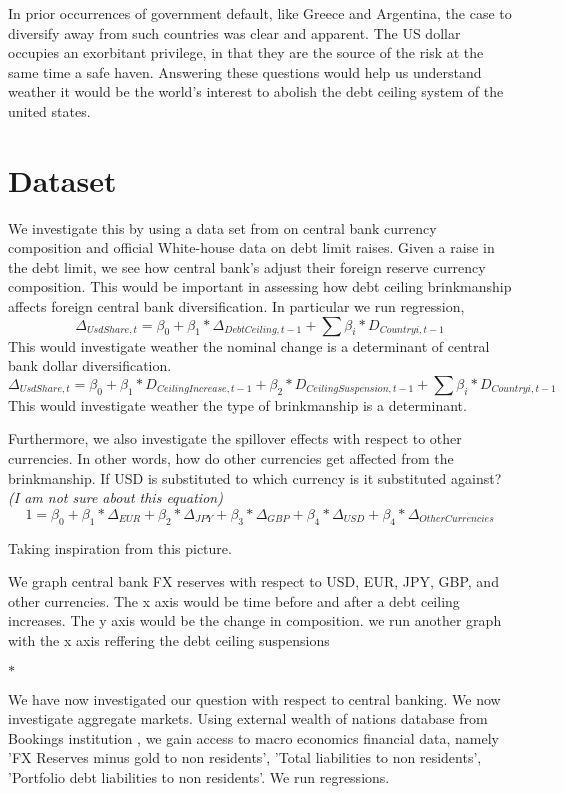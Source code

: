 \documentclass[12pt]{article}
\begin{document}
\noindent In prior occurrences of government default, like Greece and Argentina, the case to diversify away from such countries was clear and apparent. The US dollar occupies an exorbitant privilege, in that they are the source of the risk at the same time a safe haven. Answering these questions would help us understand weather it would be the world's interest to abolish the debt ceiling system of the united states. 

\section{Dataset 
\label{sec:Dataset}}

We investigate this by using a data set from \citep{Ito_and_Mccauley} on central bank currency composition and official White-house \citep{White_House} data on debt limit raises. Given a raise in the debt limit, we see how central bank's adjust their foreign reserve currency composition. This would be important in assessing how debt ceiling brinkmanship affects foreign central bank diversification. In particular we run regression,
$$\Delta_{UsdShare,t}=\beta_0+\beta_1*\Delta_{Debt Ceiling,t-1}+\sum \beta_i*D_{Countryi,t-1}$$
This would investigate weather the nominal change is a determinant of central bank dollar diversification. 
$$\Delta_{Usd Share,t}=\beta_0+\beta_1*D_{CeilingIncrease,t-1}+\beta_2*D_{CeilingSuspension,t-1}+\sum \beta_i*D_{Countryi,t-1}$$
This would investigate weather the type of brinkmanship is a determinant. 

\noindent Furthermore, we also investigate the spillover effects with respect to other currencies. In other words, how do other currencies get affected from the brinkmanship. If USD is substituted to which currency is it substituted against?\emph{(I am not sure about this equation)}
$$1 = \beta_0+\beta_1*\Delta_{EUR} +\beta_2*\Delta_{JPY}+\beta_3*\Delta_{GBP}+\beta_4*\Delta_{USD}+\beta_4*\Delta_{OtherCurrencies}$$ 

Taking inspiration from this picture.

\noindent We graph central bank FX reserves with respect to USD, EUR, JPY, GBP, and other currencies. The x axis would be time before and after a debt ceiling increases. The y axis would be the change in composition. 
we run another graph with the x axis reffering the debt ceiling suspensions

$\ast$ 

\noindent We have now investigated our question with respect to central banking. We now investigate aggregate markets. Using external wealth of nations database from Bookings institution \citep{brookings}, we gain access to macro economics financial data, namely 'FX Reserves minus gold to non residents', 'Total liabilities to non residents', 'Portfolio debt liabilities to non residents'. We run regressions.
\end{document}
